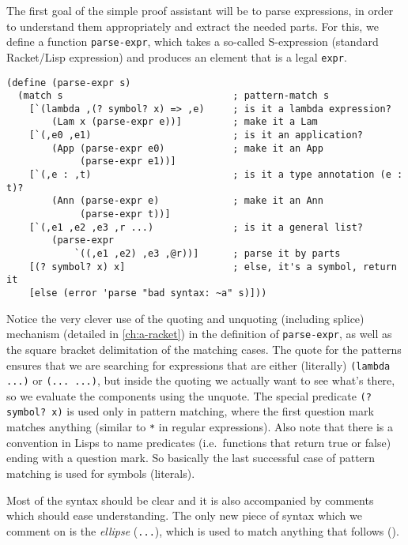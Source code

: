The first goal of the simple proof assistant will be to parse expressions,
in order to understand them appropriately and extract the needed parts.
For this, we define a function \texttt{parse-expr}, which takes a so-called
S-expression (standard Racket/Lisp expression) and produces an element
that is a legal \texttt{expr}.
{
  \small
\begin{verbatim}
(define (parse-expr s)
  (match s                              ; pattern-match s
    [`(lambda ,(? symbol? x) => ,e)     ; is it a lambda expression?
        (Lam x (parse-expr e))]         ; make it a Lam
    [`(,e0 ,e1)                         ; is it an application?
        (App (parse-expr e0)            ; make it an App
             (parse-expr e1))]
    [`(,e : ,t)                         ; is it a type annotation (e : t)?
        (Ann (parse-expr e)             ; make it an Ann
             (parse-expr t))]
    [`(,e1 ,e2 ,e3 ,r ...)              ; is it a general list?
        (parse-expr 
            `((,e1 ,e2) ,e3 ,@r))]      ; parse it by parts
    [(? symbol? x) x]                   ; else, it's a symbol, return it
    [else (error 'parse "bad syntax: ~a" s)]))
\end{verbatim}
}

Notice the very clever use of the quoting and unquoting (including splice)
mechanism (detailed in \ref{ch:a-racket}) in the definition of
\texttt{parse-expr}, as well as the square bracket delimitation of the matching
cases. The quote for the patterns ensures that
we are searching for expressions that are either (literally) \texttt{(lambda ...)}
or \texttt{(... ...)}, but inside the quoting we actually want to see
what's there, so we evaluate the components using the unquote.
The special predicate \texttt{(?\!\! symbol?\!\! x)} is used only in pattern
matching, where the first question mark matches anything (similar to
\texttt{*} in regular expressions). Also note that there is a convention
in Lisps to name predicates (i.e.\ functions that return true or false)
ending with a question mark. So basically the last successful case
of pattern matching is used for symbols (literals).

Most of the syntax should be clear and it is also accompanied by
comments which should ease understanding. The only new piece of syntax
which we comment on is the \emph{ellipse} (\texttt{...}), which is used
to match anything that follows ().

